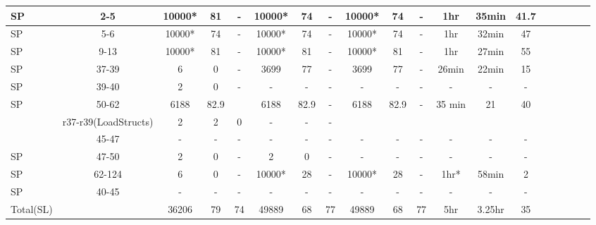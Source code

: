 \begin{table*}
\begin{CodeOut}
\begin{center}
\begin {tabular} {|l|c|c|c|c|c|c|c|c|c|c|c|c|c|c|c|c|c|c|}
SP&2-5		&10000*		&81					&-				&10000*			&74						&			-			&10000*		&74		&-			&1hr	& 35min	 &41.7\\
\hline
SP&5-6		&10000*		&74					&-				&10000*			&74						&			-			&10000*		&74		&-			&1hr	&	32min  &47\\
\hline
SP&9-13		&10000*		&81				&-				 &10000*			&81						&			-			&10000*		&81 	&-			&1hr	& 27min  &55\\
\hline
SP&37-39	&6				&0					&-				&3699				&77						&		-				&3699			&77		&-			&26min&	22min	 &15\\
\hline
SP&39-40	&2				&0					&-				&-					&-						&		-				&-				&-		&-			&-		&-			 &-	\\
\hline
SP&50-62	&6188			&82.9				&					&6188				&82.9					&-					&6188			&82.9	&-		  &35 min		&21	 &40\\
\hline
\Comment{SP&r37-r39(LoadStructs)&2&2&0&-&-&-&&&&&&\\
\hline}
SP&45-47	&-				&-					&-				&-					&-						&-					&-				&-		&-			&-				&-		&-\\
\hline
SP&47-50	&2				&0					&-				&2					&0						&-					&-				&-		&-			&-				&-		&-\\
\hline
SP&62-124	&6				&0					&-				&10000*			&28						&-					&10000*		&28		&-			&1hr*			&58min&2\\
\hline
SP&40-45	&-				&-					&-				&-					&-						&-					&-				&-		&-			&-				&-		&-\\
\hline
Total(SL)&&36206		&79					&74 			&49889			&68					  &77					&49889		&68		&77			&5hr			&3.25hr	&35\\
\hline

\end{tabular}
\end{center}
\end{CodeOut}
\vspace{- 0.35 in}
\end{table*}



